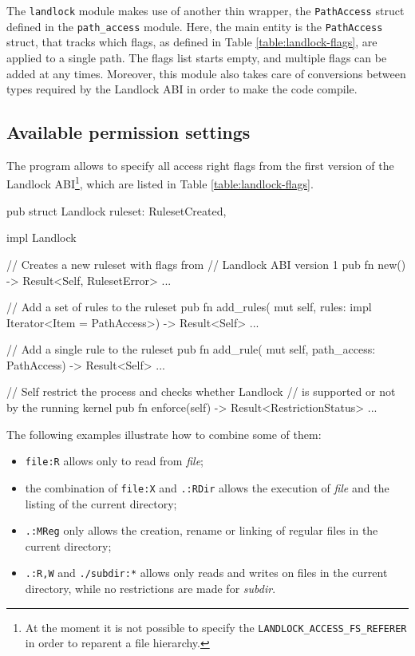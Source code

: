 The \texttt{landlock} module makes use of another thin wrapper, the \texttt{PathAccess} struct defined
in the \texttt{path\_access} module.
Here, the main entity is the \texttt{PathAccess} struct, that tracks which flags, as defined in Table \ref{table:landlock-flags},
are applied to a single path. The flags list starts empty, and multiple flags can be added at any times.
Moreover, this module also takes care of conversions between types required by the Landlock ABI in order
to make the code compile.

\subsection{Available permission settings}

The program allows to specify all access right flags from the first version of the Landlock
ABI\footnote{At the moment it is not possible to specify the \texttt{LANDLOCK\_ACCESS\_FS\_REFERER} in order to reparent a file hierarchy.},
which are listed in Table \ref{table:landlock-flags}.

\vspace*{0.5cm}
\begin{code}[language=Rust, caption=The outline of the \texttt{landlock} module., label=lst:rust-landlock]
pub struct Landlock {
  ruleset: RulesetCreated,
}

impl Landlock {
  // Creates a new ruleset with flags from
  // Landlock ABI version 1
  pub fn new() -> Result<Self, RulesetError> {...}

  // Add a set of rules to the ruleset
  pub fn add_rules(
    mut self,
    rules: impl Iterator<Item = PathAccess>)
    -> Result<Self>
  {...}

  // Add a single rule to the ruleset
  pub fn add_rule(
    mut self,
    path_access: PathAccess) -> Result<Self>
  {...}

  // Self restrict the process and checks whether Landlock
  // is supported or not by the running kernel
  pub fn enforce(self) -> Result<RestrictionStatus>
  {...}
}
\end{code}

\clearpage\noindent
The following examples illustrate how to combine some of them:
\begin{itemize}
  \item \texttt{file:R} allows only to read from \textit{file};
  \item the combination of \texttt{file:X} and \texttt{.:RDir} allows the execution of \textit{file} and the listing of the current directory;
  \item \texttt{.:MReg} only allows the creation, rename or linking of regular files in the current directory;
  \item \texttt{.:R,W} and \texttt{./subdir:*} allows only reads and writes on files in the current directory, while no restrictions are
        made for \textit{subdir}.
\end{itemize}

